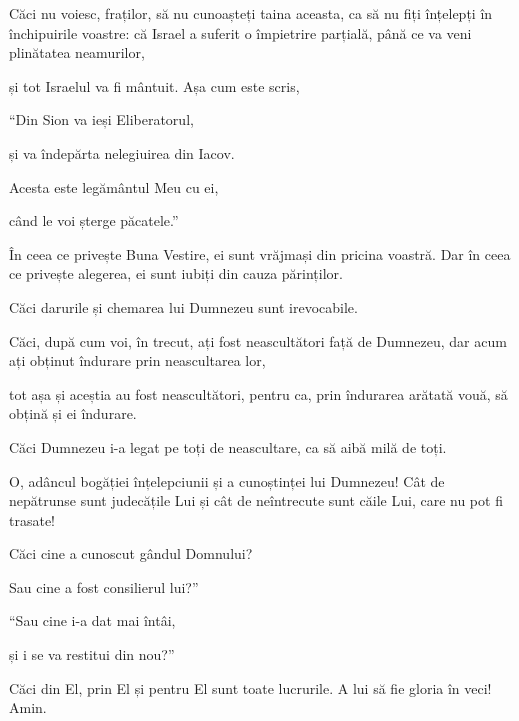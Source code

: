 {\par }{\PP {}Căci nu voiesc, fraților, să nu cunoașteți taina aceasta, ca să nu fiți înțelepți în închipuirile voastre: că Israel a suferit o împietrire parțială, până ce va veni plinătatea neamurilor,

și tot Israelul va fi mântuit. Așa cum este scris,

\par }{\Q “Din Sion va ieși Eliberatorul,

\par }{\QB și va îndepărta nelegiuirea din Iacov.


\par }{\Q {}Acesta este legământul Meu cu ei,

\par }{\QB când le voi șterge păcatele.”


\par }{\PP {}În ceea ce privește Buna Vestire, ei sunt vrăjmași din pricina voastră. Dar în ceea ce privește alegerea, ei sunt iubiți din cauza părinților.

Căci darurile și chemarea lui Dumnezeu sunt irevocabile.

Căci, după cum voi, în trecut, ați fost neascultători față de Dumnezeu, dar acum ați obținut îndurare prin neascultarea lor,

tot așa și aceștia au fost neascultători, pentru ca, prin îndurarea arătată vouă, să obțină și ei îndurare.

Căci Dumnezeu i-a legat pe toți de neascultare, ca să aibă milă de toți.


\par }{\PP {}O, adâncul bogăției înțelepciunii și a cunoștinței lui Dumnezeu! Cât de nepătrunse sunt judecățile Lui și cât de neîntrecute sunt căile Lui, care nu pot fi trasate!


\par }{\Q {}Căci cine a cunoscut gândul Domnului?

\par }{\QB Sau cine a fost consilierul lui?”


\par }{\Q {}“Sau cine i-a dat mai întâi,

\par }{\QB și i se va restitui din nou?”


\par }{\PP {}Căci din El, prin El și pentru El sunt toate lucrurile. A lui să fie gloria în veci! Amin.



}
